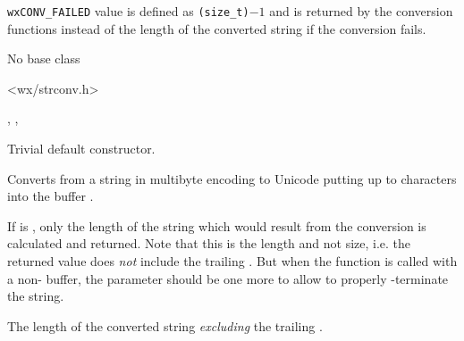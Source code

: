 
\texttt{wxCONV\_FAILED} value is defined as \texttt{(size\_t)$-1$} and is
returned by the conversion functions instead of the length of the converted
string if the conversion fails.



No base class


<wx/strconv.h>


, 
, 




\label{wxmbconvwxmbconv}


Trivial default constructor.


\label{wxmbconvmb2wc}



Converts from a string  in multibyte encoding to Unicode putting up to 
 characters into the buffer .

If  is \NULL, only the length of the string which would result from
the conversion is calculated and returned. Note that this is the length and not
size, i.e. the returned value does \emph{not} include the trailing \NUL. But
when the function is called with a non-\NULL {} buffer, the  
parameter should be one more to allow to properly \NUL-terminate the string.






The length of the converted string \emph{excluding} the trailing \NUL.


